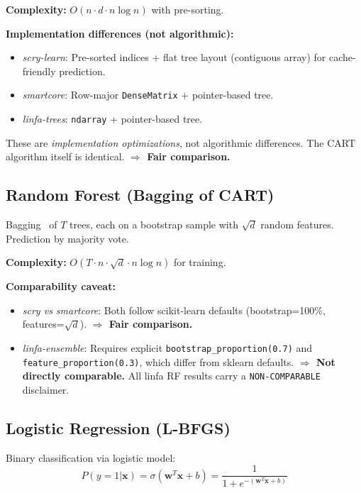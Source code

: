 \documentclass[11pt,a4paper]{article}
\begin{document}
\textbf{Complexity:} $O(n \cdot d \cdot n \log n)$ with pre-sorting.

\textbf{Implementation differences (not algorithmic):}
\begin{itemize}[nosep]
    \item \textit{scry-learn}: Pre-sorted indices + flat tree layout
          (contiguous array) for cache-friendly prediction.
    \item \textit{smartcore}: Row-major \texttt{DenseMatrix} +
          pointer-based tree.
    \item \textit{linfa-trees}: \texttt{ndarray} + pointer-based tree.
\end{itemize}

These are \emph{implementation optimizations}, not algorithmic
differences. The CART algorithm itself is identical.
\textbf{$\Rightarrow$ Fair comparison.}

\subsection{Random Forest (Bagging of CART)}

Bagging~\cite{breiman2001} of $T$ trees, each on a bootstrap sample
with $\sqrt{d}$ random features. Prediction by majority vote.

\textbf{Complexity:} $O(T \cdot n \cdot \sqrt{d} \cdot n \log n)$
for training.

\textbf{Comparability caveat:}
\begin{itemize}[nosep]
    \item \textit{scry vs smartcore}: Both follow scikit-learn defaults
          (bootstrap=100\%, features=$\sqrt{d}$).
          \textbf{$\Rightarrow$ Fair comparison.}
    \item \textit{linfa-ensemble}: Requires explicit
          \texttt{bootstrap\_proportion(0.7)} and
          \texttt{feature\_proportion(0.3)}, which differ from sklearn
          defaults. \textbf{$\Rightarrow$ Not directly comparable.}
          All linfa RF results carry a \texttt{NON-COMPARABLE} disclaimer.
\end{itemize}

\subsection{Logistic Regression (L-BFGS)}

Binary classification via logistic model:
\[
P(y=1 | \mathbf{x}) = \sigma(\mathbf{w}^T \mathbf{x} + b)
= \frac{1}{1 + e^{-(\mathbf{w}^T \mathbf{x} + b)}}
\]
\end{document}
